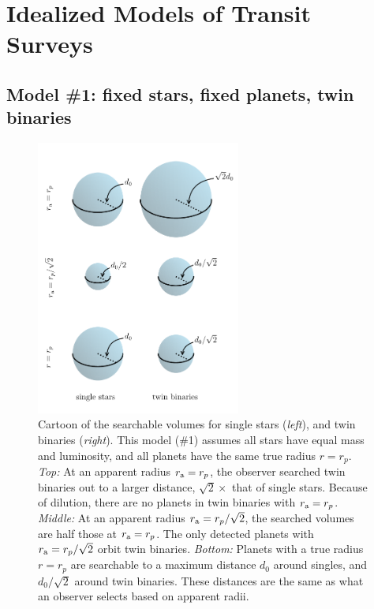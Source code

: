 \documentclass[12pt,modern]{aastex61}
\renewcommand{\a}{_{\rm a}}
\begin{document}
%

\section{Idealized Models of Transit Surveys}

\subsection{Model \#1: fixed stars, fixed planets, twin binaries}
\label{sec:model_1}

\begin{figure}[!tb]
    \begin{center}
        \includegraphics[width=0.6\textwidth]{figures/visualize_volumes.pdf}
    \end{center}
    \caption{
        Cartoon of the searchable volumes for single stars ({\it left}), and 
        twin binaries ({\it right}).
        This model (\#1) assumes all stars have equal mass and luminosity, and 
        all planets have the same true radius $r=r_p$.
        {\it Top:} At an apparent radius $r\a=r_p$,
        the observer searched twin binaries out to a larger         
        distance, $\sqrt{2}\times$ that of single stars.
        Because of dilution, there are no planets in twin binaries with 
        $r\a=r_p$.
        {\it Middle:} At an apparent radius $r\a=r_p/\sqrt{2}$, the 
        searched volumes are half those at $r\a=r_p$. 
        The only detected planets with $r\a=r_p/\sqrt{2}$ orbit twin binaries.
        {\it Bottom:} Planets with a true radius $r=r_p$ are searchable to 
        a maximum distance $d_0$ around singles, and $d_0/\sqrt{2}$ around 
        twin binaries. These distances are the same as what an observer 
        selects based on apparent radii.
    }
    \label{fig:model_1_volumes}
\end{figure}
\end{document}
